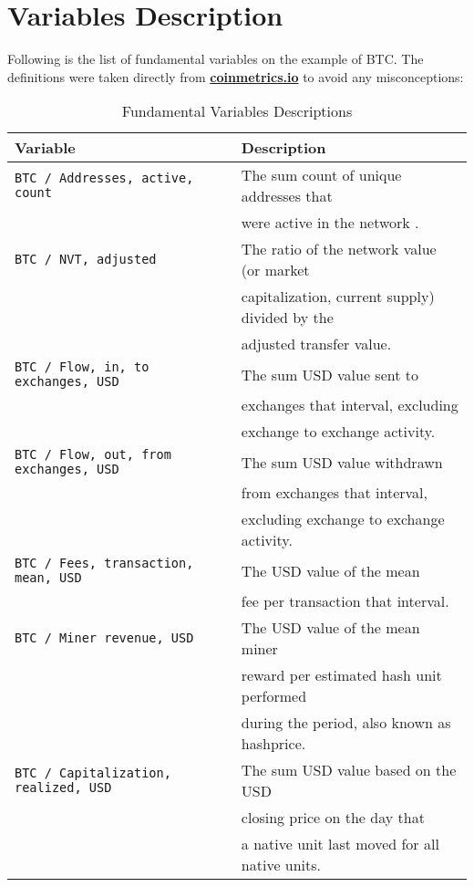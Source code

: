 \chapter{Variables Description}
\label{app:var_desc}
Following is the list of fundamental variables on the example of \ac{BTC}. The definitions were taken
directly from \textbf{\href{https://charts.coinmetrics.io/crypto-data/}{coinmetrics.io}} to avoid any misconceptions:

\begin{table}[htbp]
    \centering
    \begin{threeparttable}
    \caption{Fundamental Variables Descriptions}
    \label{tab:variables_fund}
    \begin{tabular}{ll}
    \toprule
    \textbf{Variable} & \textbf{Description} \\
    \midrule
    \texttt{BTC / Addresses, active, count} & The sum count of unique addresses that \\ & were active in the network .\\
    \texttt{BTC / NVT, adjusted} & The ratio of the network value (or market \\ & capitalization, current supply) divided by the \\ & adjusted transfer value. \\
    \texttt{BTC / Flow, in, to exchanges, USD} & The sum USD value sent to  \\ & exchanges that interval, excluding \\ & exchange to exchange activity. \\
    \texttt{BTC / Flow, out, from exchanges, USD} & The sum USD value withdrawn \\ & from exchanges that interval,  \\ & excluding exchange to exchange activity. \\
    \texttt{BTC / Fees, transaction, mean, USD} & The USD value of the mean \\ & fee per transaction that interval. \\
    \texttt{BTC / Miner revenue, USD} & The USD value of the mean miner \\ & reward per estimated hash unit performed \\ & during the period, also known as hashprice.\\
    \texttt{BTC / Capitalization, realized, USD} & The sum USD value based on the USD \\ & closing price on the day that \\ & a native unit last moved for all native units. \\

\end{tabular}
\end{threeparttable}
\end{table}
